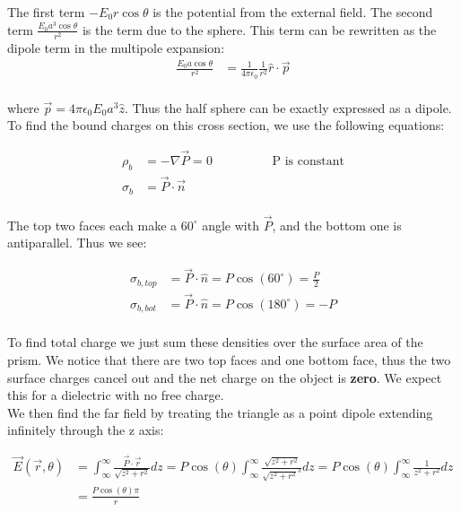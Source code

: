 \documentclass[10pt]{article} %
\begin{document}
The first term $-E_0r\cos\theta$ is the potential from the external field. The second term $\frac{E_0a^3\cos\theta}{r^2}$ is the term due
to the sphere. This term can be rewritten as the dipole term in the multipole expansion:\\

\begin{align*}
  \frac{E_0a\cos\theta}{r^2} &= \frac{1}{4\pi\epsilon_0}\frac{1}{r^2} \hat{r} \cdot \vec{p}\\
\end{align*}

where $\vec{p} = 4\pi\epsilon_0E_0 a^3 \hat{z}$. Thus the half sphere can be exactly expressed as a dipole.\\

To find the bound charges on this cross section, we use the following equations:

\begin{align*}
  \rho_b &= -\nabla \vec{P} = 0\hspace{2cm} \mbox{P is constant}\\
  \sigma_b &= \vec{P} \cdot \vec{n}\\
\end{align*}

The top two faces each make a $60^\circ$ angle with $\vec{P}$, and the bottom one is antiparallel. Thus we see:

\begin{align*}
  \sigma_{b,top} &= \vec{P} \cdot \hat{n} = P\cos\left(60^\circ\right) = \frac P2\\
  \sigma_{b,bot} &= \vec{P} \cdot \hat{n} = P\cos\left(180^\circ\right) = -P\\
\end{align*}

To find total charge we just sum these densities over the surface area of the prism. We notice that there are two top faces and one
bottom face, thus the two surface charges cancel out and the net charge on the object is \textbf{zero}. We expect this for a dielectric with no free charge.\\

We then find the far field by treating the triangle as a point dipole extending infinitely through the z axis:

\begin{align*}
  \vec{E}(\vec{r}, \theta) &= \int_\infty^\infty \frac{\vec{P}\cdot\vec{r}}{\sqrt{z^2+r^2}}dz
  = P\cos(\theta)\int_\infty^\infty \frac{\sqrt{z^2+r^2}}{\sqrt{z^2+r^2}^3}dz
  = P\cos(\theta)\int_\infty^\infty \frac{1}{z^2+r^2}dz\\
  &= \frac{P\cos(\theta)\pi}{r}
\end{align*}
\end{document}

